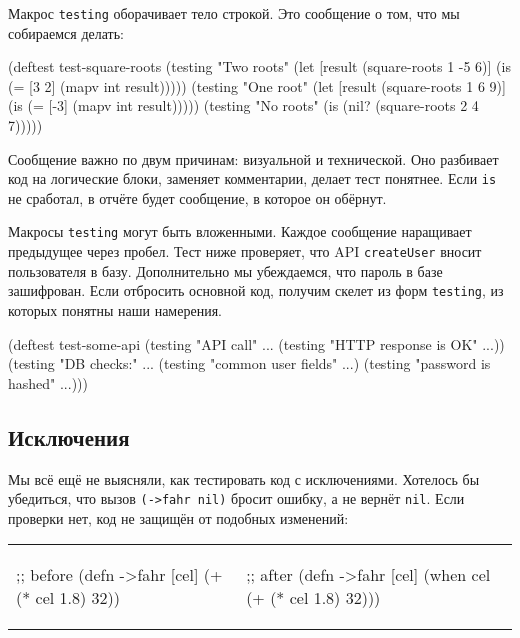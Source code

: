 Макрос \verb|testing| оборачивает тело строкой. Это сообщение о том, что мы
собираемся делать:

\begin{english}
  \begin{clojure}
(deftest test-square-roots
  (testing "Two roots"
    (let [result (square-roots 1 -5 6)]
      (is (= [3 2] (mapv int result)))))
  (testing "One root"
    (let [result (square-roots 1 6 9)]
      (is (= [-3] (mapv int result)))))
  (testing "No roots"
    (is (nil? (square-roots 2 4 7)))))
  \end{clojure}
\end{english}

Сообщение важно по двум причинам: визуальной и технической. Оно разбивает код на
логические блоки, заменяет комментарии, делает тест понятнее. Если \verb|is|
не сработал, в отчёте будет сообщение, в которое он обёрнут.

Макросы \verb|testing| могут быть вложенными. Каждое сообщение наращивает
предыдущее через пробел. Тест ниже проверяет, что API \verb|createUser| вносит
пользователя в базу. Дополнительно мы убеждаемся, что пароль в базе
зашифрован. Если отбросить основной код, получим скелет из форм \verb|testing|,
из которых понятны наши намерения.

\begin{english}
  \begin{clojure}
(deftest test-some-api
  (testing "API call" ...
    (testing "HTTP response is OK" ...))
  (testing "DB checks:" ...
    (testing "common user fields" ...)
    (testing "password is hashed" ...)))
  \end{clojure}
\end{english}

\subsection{Исключения}


Мы всё ещё не выясняли, как тестировать код с исключениями. Хотелось бы
убедиться, что вызов \verb|(->fahr nil)| бросит ошибку, а не вернёт
\verb|nil|. Если проверки нет, код не защищён от подобных изменений:

\noindent
\begin{tabular}{ @{}p{5cm} @{}p{5cm} }

\begin{english}
  \begin{clojure}
;; before
(defn ->fahr [cel]
  (+ (* cel 1.8) 32))
  \end{clojure}
\end{english}

&

\begin{english}
  \begin{clojure}
;; after
(defn ->fahr [cel]
  (when cel
    (+ (* cel 1.8) 32)))
  \end{clojure}
\end{english}

\end{tabular}

